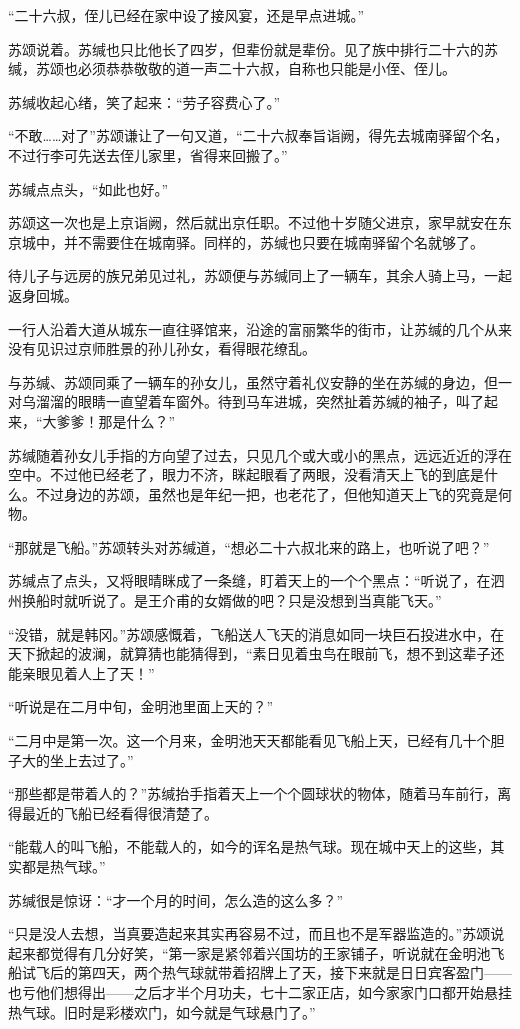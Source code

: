 “二十六叔，侄儿已经在家中设了接风宴，还是早点进城。”

苏颂说着。苏缄也只比他长了四岁，但辈份就是辈份。见了族中排行二十六的苏缄，苏颂也必须恭恭敬敬的道一声二十六叔，自称也只能是小侄、侄儿。

苏缄收起心绪，笑了起来：“劳子容费心了。”

“不敢……对了”苏颂谦让了一句又道，“二十六叔奉旨诣阙，得先去城南驿留个名，不过行李可先送去侄儿家里，省得来回搬了。”

苏缄点点头，“如此也好。”

苏颂这一次也是上京诣阙，然后就出京任职。不过他十岁随父进京，家早就安在东京城中，并不需要住在城南驿。同样的，苏缄也只要在城南驿留个名就够了。

待儿子与远房的族兄弟见过礼，苏颂便与苏缄同上了一辆车，其余人骑上马，一起返身回城。

一行人沿着大道从城东一直往驿馆来，沿途的富丽繁华的街市，让苏缄的几个从来没有见识过京师胜景的孙儿孙女，看得眼花缭乱。

与苏缄、苏颂同乘了一辆车的孙女儿，虽然守着礼仪安静的坐在苏缄的身边，但一对乌溜溜的眼睛一直望着车窗外。待到马车进城，突然扯着苏缄的袖子，叫了起来，“大爹爹！那是什么？”

苏缄随着孙女儿手指的方向望了过去，只见几个或大或小的黑点，远远近近的浮在空中。不过他已经老了，眼力不济，眯起眼看了两眼，没看清天上飞的到底是什么。不过身边的苏颂，虽然也是年纪一把，也老花了，但他知道天上飞的究竟是何物。

“那就是飞船。”苏颂转头对苏缄道，“想必二十六叔北来的路上，也听说了吧？”

苏缄点了点头，又将眼晴眯成了一条缝，盯着天上的一个个黑点：“听说了，在泗州换船时就听说了。是王介甫的女婿做的吧？只是没想到当真能飞天。”

“没错，就是韩冈。”苏颂感慨着，飞船送人飞天的消息如同一块巨石投进水中，在天下掀起的波澜，就算猜也能猜得到，“素日见着虫鸟在眼前飞，想不到这辈子还能亲眼见着人上了天！”

“听说是在二月中旬，金明池里面上天的？”

“二月中是第一次。这一个月来，金明池天天都能看见飞船上天，已经有几十个胆子大的坐上去过了。”

“那些都是带着人的？”苏缄抬手指着天上一个个圆球状的物体，随着马车前行，离得最近的飞船已经看得很清楚了。

“能载人的叫飞船，不能载人的，如今的诨名是热气球。现在城中天上的这些，其实都是热气球。”

苏缄很是惊讶：“才一个月的时间，怎么造的这么多？”

“只是没人去想，当真要造起来其实再容易不过，而且也不是军器监造的。”苏颂说起来都觉得有几分好笑，“第一家是紧邻着兴国坊的王家铺子，听说就在金明池飞船试飞后的第四天，两个热气球就带着招牌上了天，接下来就是日日宾客盈门——也亏他们想得出——之后才半个月功夫，七十二家正店，如今家家门口都开始悬挂热气球。旧时是彩楼欢门，如今就是气球悬门了。”

